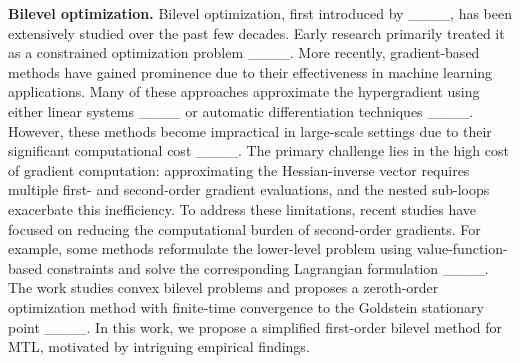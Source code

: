 \vspace{0.2cm}
\noindent\textbf{Bilevel optimization.} 
Bilevel optimization, first introduced by ____, has been extensively studied over the past few decades. Early research primarily treated it as a constrained optimization problem ____. More recently, gradient-based methods have gained prominence due to their effectiveness in machine learning applications. Many of these approaches approximate the hypergradient using either linear systems ____ or automatic differentiation techniques ____. However, these methods become impractical in large-scale settings due to their significant computational cost ____. 
The primary challenge lies in the high cost of gradient computation: approximating the Hessian-inverse vector requires multiple first- and second-order gradient evaluations, and the nested sub-loops exacerbate this inefficiency. To address these limitations, recent studies have focused on reducing the computational burden of second-order gradients. For example, some methods reformulate the lower-level problem using value-function-based constraints and solve the corresponding Lagrangian formulation ____. The work studies
convex bilevel problems and proposes a zeroth-order optimization method with finite-time
convergence to the Goldstein stationary point ____. In this work, we propose a simplified first-order bilevel method for MTL, motivated by intriguing empirical findings.